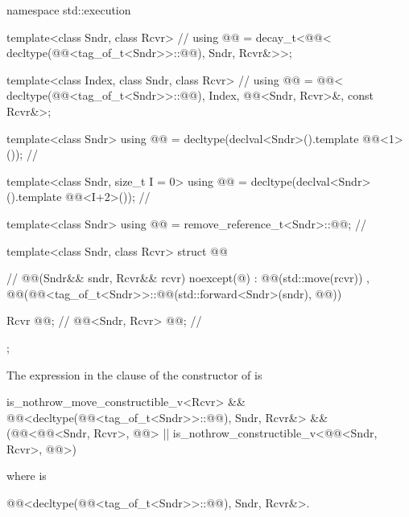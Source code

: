 \pnum
\begin{codeblock}
namespace std::execution {
  template<class Sndr, class Rcvr>                              // \expos
  using @@ = decay_t<@@<
    decltype(@@<tag_of_t<Sndr>>::@@), Sndr, Rcvr&>>;

  template<class Index, class Sndr, class Rcvr>                 // \expos
  using @@ = @@<
    decltype(@@<tag_of_t<Sndr>>::@@), Index,
    @@<Sndr, Rcvr>&, const Rcvr&>;

  template<class Sndr>
  using @@ = decltype(declval<Sndr>().template @@<1>());                // \expos

  template<class Sndr, size_t I = 0>
  using @@ = decltype(declval<Sndr>().template @@<I+2>());             // \expos

  template<class Sndr>
  using @@ = remove_reference_t<Sndr>::@@;                    // \expos

  template<class Sndr, class Rcvr>
  struct @@ {                                          // \expos
    @@(Sndr&& sndr, Rcvr&& rcvr) noexcept(@\seebelow@)
      : @@(std::move(rcvr))
      , @@(@@<tag_of_t<Sndr>>::@@(std::forward<Sndr>(sndr), @@)) { }

    Rcvr @@;                                                  // \expos
    @@<Sndr, Rcvr> @@;                               // \expos
  };
}
\end{codeblock}

\pnum
The expression in the  clause of
the constructor of  is
\begin{codeblock}
is_nothrow_move_constructible_v<Rcvr> &&
@@<decltype(@@<tag_of_t<Sndr>>::@@), Sndr, Rcvr&> &&
(@@<@@<Sndr, Rcvr>, @@> ||
 is_nothrow_constructible_v<@@<Sndr, Rcvr>, @@>)
\end{codeblock}
where  is
\begin{codeblock}
@@<decltype(@@<tag_of_t<Sndr>>::@@), Sndr, Rcvr&>.
\end{codeblock}

